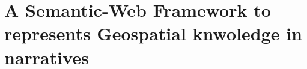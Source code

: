 






\chapter{A Semantic-Web Framework to represents Geospatial knwoledge in narratives}\label{chap:SW-framework}

